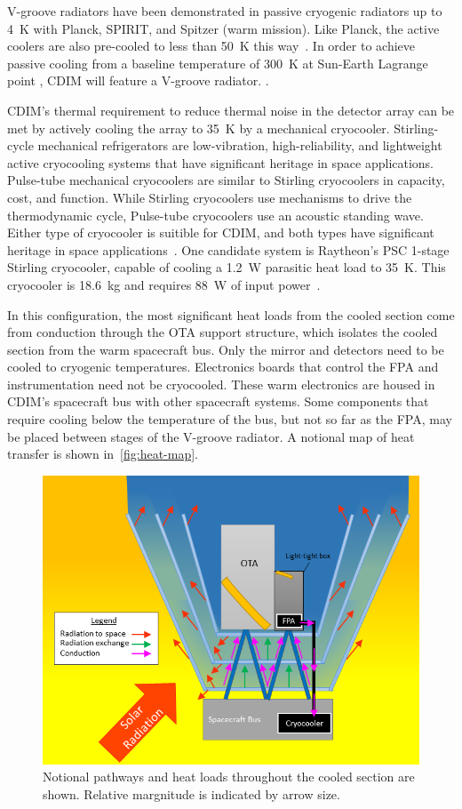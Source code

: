 \documentclass{ws-jai}
\begin{document}
V-groove radiators have been demonstrated in passive cryogenic radiators up to \SI{4}{\kelvin} with Planck, SPIRIT, and Spitzer (warm mission).\@
Like Planck, the active coolers are also pre-cooled to less than \SI{50}{\kelvin} this way~\cite{shinozaki2014spica}.
In order to achieve passive cooling from a baseline temperature of \SI{300}{\kelvin} at Sun-Earth Lagrange point \Ltwo, CDIM will feature a  V-groove radiator.
.

CDIM's thermal requirement to reduce thermal noise in the detector array can be met by actively cooling the array to \SI{35}{\kelvin} by a mechanical cryocooler.
Stirling-cycle mechanical refrigerators are low-vibration, high-reliability, and lightweight active cryocooling systems that have significant heritage in space applications.
Pulse-tube mechanical cryocoolers are similar to Stirling cryocoolers in capacity, cost, and function.
While Stirling cryocoolers use mechanisms to drive the thermodynamic cycle, Pulse-tube cryocoolers use an acoustic standing wave.
Either type of cryocooler is suitible for CDIM, and both types have significant heritage in space applications~\cite{gilmore2003spacecraft}.
One candidate system is Raytheon's PSC 1-stage Stirling cryocooler, capable of cooling a \SI{1.2}{\watt} parasitic heat load to \SI{35}{\kelvin}.
This cryocooler is \SI{18.6}{\kilo\gram} and requires \SI{88}{\watt} of input power~\cite{gilmore2003spacecraft}.

In this configuration, the most significant heat loads from the cooled section come from conduction through the OTA support structure, which isolates the cooled section from the warm spacecraft bus.
Only the mirror and detectors need to be cooled to cryogenic temperatures.
Electronics boards that control the FPA and instrumentation need not be cryocooled.
These warm electronics are housed in CDIM's spacecraft bus with other spacecraft systems.
Some components that require cooling below the temperature of the bus, but not so far as the FPA, may be placed between stages of the V-groove radiator.
A notional map of heat transfer is shown in~\autoref{fig:heat-map}.

\begin{figure}[!ht]
  \centering
  \includegraphics[width=.6\linewidth]{figs/heat-map.png}
  \caption{Notional pathways and heat loads throughout the cooled section are shown. Relative margnitude is indicated by arrow size.
\label{fig:heat-map}
}
\end{figure}
\end{document}

